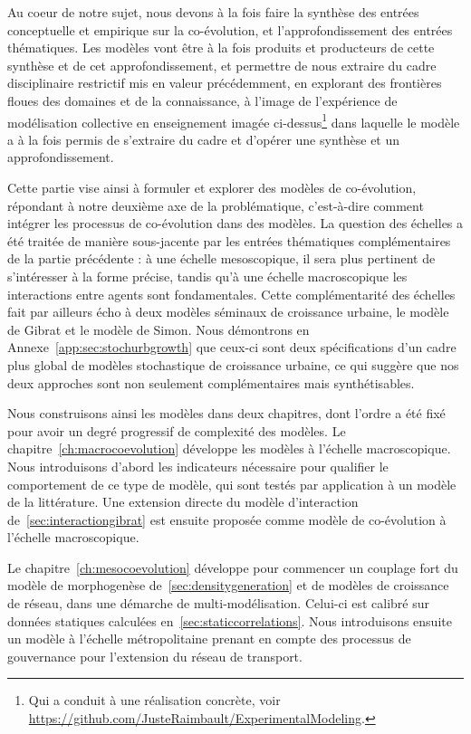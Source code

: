 Au coeur de notre sujet, nous devons à la fois faire la synthèse des entrées conceptuelle et empirique sur la co-évolution, et l'approfondissement des entrées thématiques. Les modèles vont être à la fois produits et producteurs de cette synthèse et de cet approfondissement, et permettre de nous extraire du cadre disciplinaire restrictif mis en valeur précédemment, en explorant des frontières floues des domaines et de la connaissance, à l'image de l'expérience de modélisation collective en enseignement imagée ci-dessus\footnote{Qui a conduit à une réalisation concrète, voir \url{https://github.com/JusteRaimbault/ExperimentalModeling}.} dans laquelle le modèle a à la fois permis de s'extraire du cadre et d'opérer une synthèse et un approfondissement.


Cette partie vise ainsi à formuler et explorer des modèles de co-évolution, répondant à notre deuxième axe de la problématique, c'est-à-dire comment intégrer les processus de co-évolution dans des modèles. La question des échelles a été traitée de manière sous-jacente par les entrées thématiques complémentaires de la partie précédente : à une échelle mesoscopique, il sera plus pertinent de s'intéresser à la forme précise, tandis qu'à une échelle macroscopique les interactions entre agents sont fondamentales. Cette complémentarité des échelles fait par ailleurs écho à deux modèles séminaux de croissance urbaine, le modèle de Gibrat et le modèle de Simon. Nous démontrons en Annexe~\ref{app:sec:stochurbgrowth} que ceux-ci sont deux spécifications d'un cadre plus global de modèles stochastique de croissance urbaine, ce qui suggère que nos deux approches sont non seulement complémentaires mais synthétisables.


Nous construisons ainsi les modèles dans deux chapitres, dont l'ordre a été fixé pour avoir un degré progressif de complexité des modèles. Le chapitre~\ref{ch:macrocoevolution} développe les modèles à l'échelle macroscopique. Nous introduisons d'abord les indicateurs nécessaire pour qualifier le comportement de ce type de modèle, qui sont testés par application à un modèle de la littérature. Une extension directe du modèle d'interaction de~\ref{sec:interactiongibrat} est ensuite proposée comme modèle de co-évolution à l'échelle macroscopique.

Le chapitre~\ref{ch:mesocoevolution} développe pour commencer un couplage fort du modèle de morphogenèse de~\ref{sec:densitygeneration} et de modèles de croissance de réseau, dans une démarche de multi-modélisation. Celui-ci est calibré sur données statiques calculées en~\ref{sec:staticcorrelations}. Nous introduisons ensuite un modèle à l'échelle métropolitaine prenant en compte des processus de gouvernance pour l'extension du réseau de transport.



